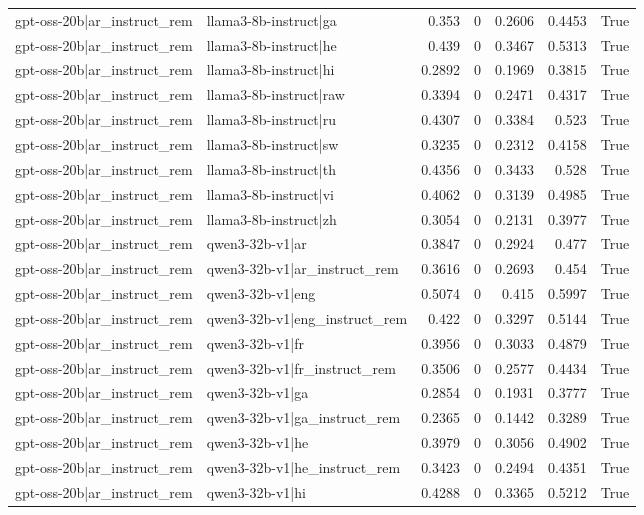 \begin{table}
\begin{tabular}{l l r r r r l}
gpt-oss-20b|ar_instruct_rem & llama3-8b-instruct|ga & 0.353 & 0 & 0.2606 & 0.4453 & True \\
gpt-oss-20b|ar_instruct_rem & llama3-8b-instruct|he & 0.439 & 0 & 0.3467 & 0.5313 & True \\
gpt-oss-20b|ar_instruct_rem & llama3-8b-instruct|hi & 0.2892 & 0 & 0.1969 & 0.3815 & True \\
gpt-oss-20b|ar_instruct_rem & llama3-8b-instruct|raw & 0.3394 & 0 & 0.2471 & 0.4317 & True \\
gpt-oss-20b|ar_instruct_rem & llama3-8b-instruct|ru & 0.4307 & 0 & 0.3384 & 0.523 & True \\
gpt-oss-20b|ar_instruct_rem & llama3-8b-instruct|sw & 0.3235 & 0 & 0.2312 & 0.4158 & True \\
gpt-oss-20b|ar_instruct_rem & llama3-8b-instruct|th & 0.4356 & 0 & 0.3433 & 0.528 & True \\
gpt-oss-20b|ar_instruct_rem & llama3-8b-instruct|vi & 0.4062 & 0 & 0.3139 & 0.4985 & True \\
gpt-oss-20b|ar_instruct_rem & llama3-8b-instruct|zh & 0.3054 & 0 & 0.2131 & 0.3977 & True \\
gpt-oss-20b|ar_instruct_rem & qwen3-32b-v1|ar & 0.3847 & 0 & 0.2924 & 0.477 & True \\
gpt-oss-20b|ar_instruct_rem & qwen3-32b-v1|ar_instruct_rem & 0.3616 & 0 & 0.2693 & 0.454 & True \\
gpt-oss-20b|ar_instruct_rem & qwen3-32b-v1|eng & 0.5074 & 0 & 0.415 & 0.5997 & True \\
gpt-oss-20b|ar_instruct_rem & qwen3-32b-v1|eng_instruct_rem & 0.422 & 0 & 0.3297 & 0.5144 & True \\
gpt-oss-20b|ar_instruct_rem & qwen3-32b-v1|fr & 0.3956 & 0 & 0.3033 & 0.4879 & True \\
gpt-oss-20b|ar_instruct_rem & qwen3-32b-v1|fr_instruct_rem & 0.3506 & 0 & 0.2577 & 0.4434 & True \\
gpt-oss-20b|ar_instruct_rem & qwen3-32b-v1|ga & 0.2854 & 0 & 0.1931 & 0.3777 & True \\
gpt-oss-20b|ar_instruct_rem & qwen3-32b-v1|ga_instruct_rem & 0.2365 & 0 & 0.1442 & 0.3289 & True \\
gpt-oss-20b|ar_instruct_rem & qwen3-32b-v1|he & 0.3979 & 0 & 0.3056 & 0.4902 & True \\
gpt-oss-20b|ar_instruct_rem & qwen3-32b-v1|he_instruct_rem & 0.3423 & 0 & 0.2494 & 0.4351 & True \\
gpt-oss-20b|ar_instruct_rem & qwen3-32b-v1|hi & 0.4288 & 0 & 0.3365 & 0.5212 & True \\

\end{tabular}
\end{table}
